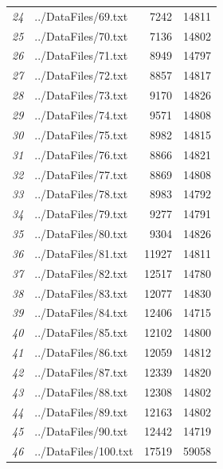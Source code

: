 \documentclass[12pt]{article}
\begin{document}
\begin{table}[ht]
{\begin{tabular}{rlrr}
								{\textit{24}} & ../DataFiles/69.txt & 7242 & 14811 \\ 
								{\textit{25}} & ../DataFiles/70.txt & 7136 & 14802 \\ 
								{\textit{26}} & ../DataFiles/71.txt & 8949 & 14797 \\ 
								{\textit{27}} & ../DataFiles/72.txt & 8857 & 14817 \\ 
								{\textit{28}} & ../DataFiles/73.txt & 9170 & 14826 \\ 
								{\textit{29}} & ../DataFiles/74.txt & 9571 & 14808 \\ 
								{\textit{30}} & ../DataFiles/75.txt & 8982 & 14815 \\ 
								{\textit{31}} & ../DataFiles/76.txt & 8866 & 14821 \\ 
								{\textit{32}} & ../DataFiles/77.txt & 8869 & 14808 \\ 
								{\textit{33}} & ../DataFiles/78.txt & 8983 & 14792 \\ 
								{\textit{34}} & ../DataFiles/79.txt & 9277 & 14791 \\ 
								{\textit{35}} & ../DataFiles/80.txt & 9304 & 14826 \\ 
								{\textit{36}} & ../DataFiles/81.txt & 11927 & 14811 \\ 
								{\textit{37}} & ../DataFiles/82.txt & 12517 & 14780 \\ 
								{\textit{38}} & ../DataFiles/83.txt & 12077 & 14830 \\ 
								{\textit{39}} & ../DataFiles/84.txt & 12406 & 14715 \\ 
								{\textit{40}} & ../DataFiles/85.txt & 12102 & 14800 \\ 
								{\textit{41}} & ../DataFiles/86.txt & 12059 & 14812 \\ 
								{\textit{42}} & ../DataFiles/87.txt & 12339 & 14820 \\ 
								{\textit{43}} & ../DataFiles/88.txt & 12308 & 14802 \\ 
								{\textit{44}} & ../DataFiles/89.txt & 12163 & 14802 \\ 
								{\textit{45}} & ../DataFiles/90.txt & 12442 & 14719 \\ 
								{\textit{46}} & ../DataFiles/100.txt & 17519 & 59058 \\ 
								\hline
							\end{tabular}
						}
					\end{table}
					\clearpage
					
\end{document}
